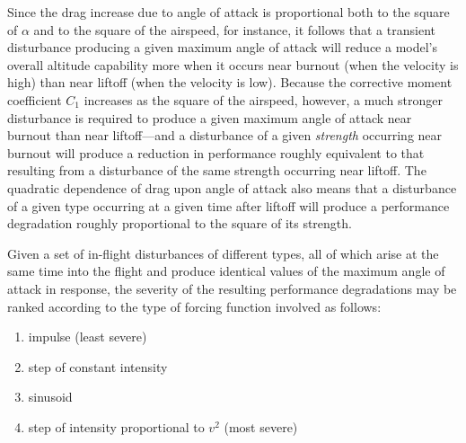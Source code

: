 Since the drag increase due to angle of attack is proportional both to the square of $\alpha$ and
to the square of the airspeed, for instance, it follows that a transient disturbance producing a
given maximum angle of attack will reduce a model's overall altitude capability more when it
occurs near burnout (when the velocity is high) than near liftoff (when the velocity is low).
Because the corrective moment coefficient $C_1$ increases as the square of the airspeed, however, a
much stronger disturbance is required to produce a given maximum angle of attack near burnout than
near liftoff---and a disturbance of a given \emph{strength} occurring near burnout will produce a
reduction in performance roughly equivalent to that resulting from a disturbance of the same
strength occurring near liftoff. The quadratic dependence of drag upon angle of attack also means
that a disturbance of a given type occurring at a given time after liftoff will produce a
performance degradation roughly proportional to the square of its strength.

Given a set of in-flight disturbances of different types, all of which arise at the same time into
the flight and produce identical values of the maximum angle of attack in response, the severity
of the resulting performance degradations may be ranked according to the type of forcing function
involved as follows:
\begin{enumerate}[label=(\alph*)]
  \item impulse (least severe)
  \item step of constant intensity
  \item sinusoid
  \item step of intensity proportional to $v^{2}$ (most severe)
\end{enumerate}

